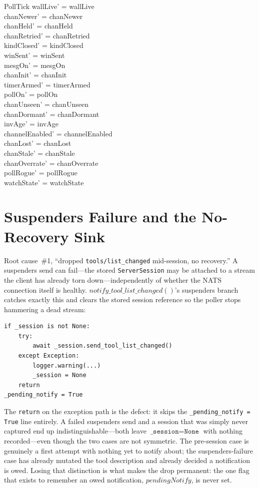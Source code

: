 \documentclass[a4paper,10pt,fleqn]{article}
\begin{document}
\begin{schema}{PollTick}
  wallLive' = wallLive \\
  chanNewer' = chanNewer \\
  chanHeld' = chanHeld \\
  chanRetried' = chanRetried \\
  kindClosed' = kindClosed \\
  winSent' = winSent \\
  mesgOn' = mesgOn \\
  chanInit' = chanInit \\
  timerArmed' = timerArmed \\
  pollOn' = pollOn \\
  chanUnseen' = chanUnseen \\
  chanDormant' = chanDormant \\
  invAge' = invAge \\
  channelEnabled' = channelEnabled \\
  chanLost' = chanLost \\
  chanStale' = chanStale \\
  chanOverrate' = chanOverrate \\
  pollRogue' = pollRogue \\
  watchState' = watchState
\end{schema}

\section{Suspenders Failure and the No-Recovery Sink}
\label{sec:sessionloss}

Root cause~\#1, ``dropped \texttt{tools/list\_changed} mid-session, no
recovery.''  A suspenders send can fail---the stored
\texttt{ServerSession} may be attached to a stream the client has
already torn down---independently of whether the NATS connection
itself is healthy.  $notify\_tool\_list\_changed()$'s suspenders branch
catches exactly this and clears the stored session reference so the
poller stops hammering a dead stream:

\begin{verbatim}
if _session is not None:
    try:
        await _session.send_tool_list_changed()
    except Exception:
        logger.warning(...)
        _session = None
    return
_pending_notify = True
\end{verbatim}

The \texttt{return} on the exception path is the defect: it skips the
\texttt{\_pending\_notify = True} line entirely.  A failed suspenders
send and a session that was simply never captured end up
indistinguishable---both leave $\texttt{\_session} = \texttt{None}$
with nothing recorded---even though the two cases are not
symmetric.  The pre-session case is genuinely a first attempt with
nothing yet to notify about; the suspenders-failure case has already
mutated the tool description and already decided a notification is
owed.  Losing that distinction is what makes the drop permanent: the
one flag that exists to remember an owed notification, $pendingNotify$,
is never set.
\end{document}
